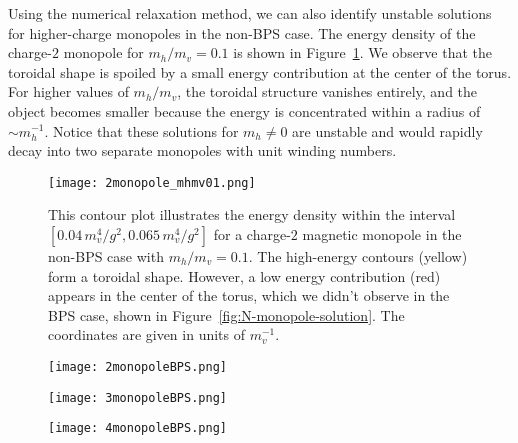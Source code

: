 \documentclass[aps, prd, twocolumn, superscriptaddress, preprintnumbers, nofootinbib, longbibliography]{revtex4-1}
\begin{document}
Using the numerical relaxation method, we can also identify unstable solutions for higher-charge monopoles in the non-BPS case. The energy density of the charge-$2$ monopole for $m_h/m_v=0.1$ is shown in Figure~\ref{fig:2Monopole-nonBPS}. We observe that the toroidal shape is spoiled by a small energy contribution at the center of the torus. For higher values of $m_h/m_v$, the toroidal structure vanishes entirely, and the object becomes smaller because the energy is concentrated within a radius of $\sim m_h^{-1}$. Notice that these solutions for $m_h \neq 0$ are unstable and would rapidly decay into two separate monopoles with unit winding numbers.

\begin{figure}[h]
    \texttt{[image: 2monopole\_mhmv01.png]}
    \caption{This contour plot illustrates the energy density within the interval $[0.04\, m_v^4/g^2, 0.065\, m_v^4/g^2]$ for a charge-$2$ magnetic monopole in the non-BPS case with $m_h/m_v=0.1$. The high-energy contours (yellow) form a toroidal shape. However, a low energy contribution (red) appears in the center of the torus, which we didn't observe in the BPS case, shown in Figure~\ref{fig:N-monopole-solution}. The coordinates are given in units of $m_v^{-1}$.}
    \label{fig:2Monopole-nonBPS}
\end{figure} 

\begin{figure*}
  \centering
  \begin{subfigure}{0.3\textwidth}
    \texttt{[image: 2monopoleBPS.png]}
  \end{subfigure}
  \hspace{\fill}
  \begin{subfigure}{0.3\textwidth}
    \texttt{[image: 3monopoleBPS.png]}
  \end{subfigure}
  \hspace{\fill}
  \begin{subfigure}{0.3\textwidth}
    \texttt{[image: 4monopoleBPS.png]}
  \end{subfigure}
  \caption{These contour plots illustrate the toroidal shape of the energy density for charge -$2$, -$3$, and -$4$ monopoles in the BPS limit $m_h \rightarrow 0$. We can observe that the radius of the torus increases for higher charges. The contours illustrate energy densities within the intervals $[0.045,0.07]$, $[0.032,0.053]$, and $[0.03,0.045]$ (in units of $m_v^4/g^2$), respectively. The length values are given in units of $m_v^{-1}$.}
  \label{fig:N-monopole-solution}
\end{figure*} 
\end{document}
